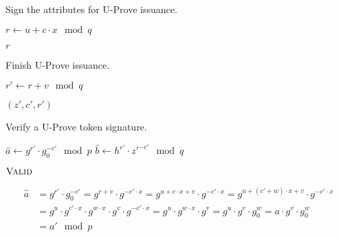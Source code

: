 \begin{algorithm}
  \caption{Sign the attributes for U-Prove issuance.}
  \label{alg:UP-issuance-blind-sign}
  \addtolength{\baselineskip}{1mm}
  \begin{algorithmic}[1]
      \State $r \gets u + c \cdot x \mod q$

      \Return $r$
    \EndFunction
  \end{algorithmic}
\end{algorithm}

\begin{algorithm}
  \caption{Finish U-Prove issuance.}
  \label{alg:UP-issuance-finish}
  \addtolength{\baselineskip}{1mm}
  \begin{algorithmic}[1]
      \State $r' \gets r + v \mod q$

        \Return {}
      \EndIf

      \Return $(z', c', r')$
    \EndFunction
  \end{algorithmic}
\end{algorithm}

\begin{algorithm}
  \caption{Verify a U-Prove token signature.}
  \label{alg:UP-verify-token}
  \addtolength{\baselineskip}{1mm}
  \begin{algorithmic}[1]
      \State $\hat{a} \gets g^{r'} \cdot g_0^{-c'} \mod p$
      \State $\hat{b} \gets h^{r'} \cdot z'^{-c'} \mod q$
        \Return {}
      \EndIf

      \Return $\Call{Valid}{}$
    \EndFunction
  \end{algorithmic}
\end{algorithm}

\begin{align*}
  \hat{a}
  & = g^{r'} \cdot g_0^{-c'}
  = g^{r + v} \cdot g^{-c' \cdot x}
  = g^{u + c \cdot x + v} \cdot g^{-c' \cdot x}
  = g^{u + (c' + w) \cdot x + v} \cdot g^{-c' \cdot x} \\
  & = g^u \cdot g^{c' \cdot x} \cdot g^{w \cdot x} \cdot g^v \cdot g^{-c' \cdot x}
  = g^u \cdot g^{w \cdot x} \cdot g^v
  = g^u \cdot g^v \cdot g_0^w
  = a \cdot g^v \cdot g_0^w \\
  & = a' \mod p
\end{align*}


